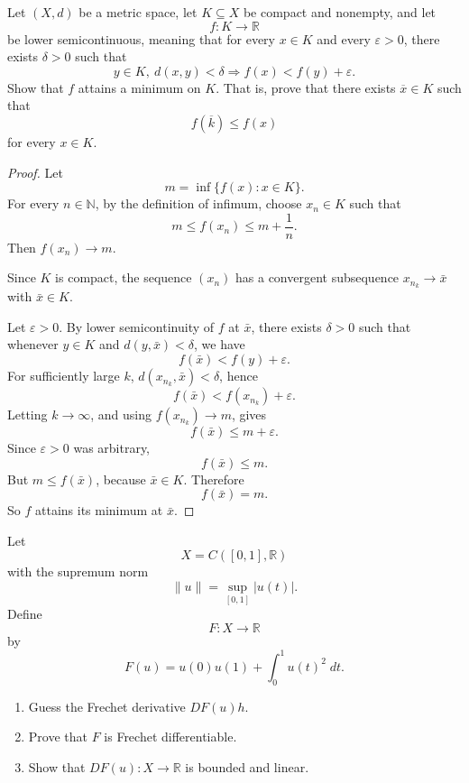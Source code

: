 \begin{prob}
    Let $(X,d)$ be a metric space, let $K \subseteq X$ be 
    compact and nonempty, and let 
    \[
        f : K \to \mathbb R
    \]
    be lower semicontinuous, meaning that for every $x \in K$ 
    and every $\varepsilon > 0$, there exists $\delta > 0$ 
    such that 
    \[
        y \in K, \ d(x,y) < \delta \Rightarrow 
        f(x) < f(y) + \varepsilon.
    \]
    Show that $f$ attains a minimum on $K$.
    That is, prove that there exists $\overline x \in K$ such that 
    \[
        f(\overline k) \leq f(x)
    \]
    for every $x \in K$.
\end{prob}
\begin{proof}
    Let
    \[
        m=\inf\{f(x):x\in K\}.
    \]
    For every \(n\in\mathbb N\), by the definition of infimum, choose
    \(x_n\in K\) such that
    \[
        m\leq f(x_n)\leq m+\frac1n.
    \]
    Then \(f(x_n)\to m\).

    Since \(K\) is compact, the sequence \((x_n)\) has a convergent
    subsequence \(x_{n_k}\to \bar x\) with \(\bar x\in K\).

    Let \(\varepsilon>0\). By lower semicontinuity of \(f\) at \(\bar x\),
    there exists \(\delta>0\) such that whenever \(y\in K\) and
    \(d(y,\bar x)<\delta\), we have
    \[
        f(\bar x)<f(y)+\varepsilon.
    \]
    For sufficiently large \(k\), \(d(x_{n_k},\bar x)<\delta\), hence
    \[
        f(\bar x)<f(x_{n_k})+\varepsilon.
    \]
    Letting \(k\to\infty\), and using \(f(x_{n_k})\to m\), gives
    \[
        f(\bar x)\leq m+\varepsilon.
    \]
    Since \(\varepsilon>0\) was arbitrary,
    \[
        f(\bar x)\leq m.
    \]
    But \(m\leq f(\bar x)\), because \(\bar x\in K\). Therefore
    \[
        f(\bar x)=m.
    \]
    So \(f\) attains its minimum at \(\bar x\).
\end{proof}

\begin{prob}
    Let 
    \[
        X = C([0,1],\mathbb R)
    \]
    with the supremum norm 
    \[
        \|u\| = \sup_{[0,1]}|u(t)|.
    \]
    Define 
    \[
        F : X \to \mathbb R
    \]
    by 
    \[
        F(u) = u(0)u(1) + \int_0^1 u(t)^2 \; dt.
    \]

    \begin{enumerate}[label=\alph*)]
        \item Guess the Frechet derivative $DF(u)h$.
        \item Prove that $F$ is Frechet differentiable.
        \item Show that $DF(u):X \to \mathbb R$ is 
            bounded and linear. 
    \end{enumerate}
\end{prob}

